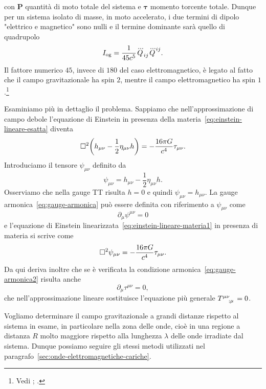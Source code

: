con $\bm{P}$ quantità di moto totale del sistema e $\bm{\tau}$ momento torcente
totale.  Dunque per un sistema isolato di masse, in moto accelerato, i due
termini di dipolo "elettrico e magnetico" sono nulli e il termine dominante sarà
quello di quadrupolo
\begin{equation}
  I_{\textup{og}} = \frac{1}{45c^{5}}\dddot{Q}_{ij}\dddot{Q}^{ij}.
\end{equation}
Il fattore numerico $45$, invece di $180$ del caso elettromagnetico, è legato al
fatto che il campo gravitazionale ha spin $2$, mentre il campo elettromagnetico
ha spin $1$.\footnote{Vedi \textcite[974]{misner:gravitation};
  \textcite[471]{shapiro:black-holes}.}

Esaminiamo più in dettaglio il problema.  Sappiamo che nell'approssimazione di
campo debole l'equazione di Einstein in presenza della
materia~\eqref{eq:einstein-lineare-esatta} diventa
\begin{equation}
  \label{eq:einstein-lineare-materia1}
  \Box^{2} \bigg(h_{\mu\nu} - \frac{1}{2} \eta_{\mu\nu}h \bigg) = -\frac{16\pi
    G}{c^{4}} \tau_{\mu\nu}.
\end{equation}
Introduciamo il tensore $\psi_{\mu\nu}$ definito da
\begin{equation}
  \psi_{\mu\nu} = h_{\mu\nu} - \frac{1}{2} \eta_{\mu\nu} h.
\end{equation}
Osserviamo che nella gauge TT risulta $h = 0$ e quindi
$\psi_{\mu\nu} = h_{\mu\nu}$.  La gauge armonica~\eqref{eq:gauge-armonica} può
essere definita con riferimento a $\psi_{\mu\nu}$ come
\begin{equation}
  \label{eq:gauge-armonica2}
  \partial_{\mu}\psi^{\mu\nu} = 0
\end{equation}
e l'equazione di Einstein linearizzata~\eqref{eq:einstein-lineare-materia1} in
presenza di materia si scrive come
\begin{equation}
  \label{eq:einstein-lineare-materia2}
  \Box^{2} \psi_{\mu\nu} = -\frac{16\pi G}{c^{4}} \tau_{\mu\nu}.
\end{equation}
Da qui deriva inoltre che se è verificata la condizione
armonica~\eqref{eq:gauge-armonica2} risulta anche
\begin{equation}
  \label{eq:gauge-armonica-tau}
  \partial_{\mu}\tau^{\mu\nu} = 0,
\end{equation}
che nell'approssimazione lineare sostituisce l'equazione più generale
$\tensor{T}{^{\mu\nu}_{;\mu}} = 0$.

Vogliamo determinare il campo gravitazionale a grandi distanze rispetto al
sistema in esame, in particolare nella zona delle onde,
cioè in una regione a distanza $R$ molto maggiore rispetto alla lunghezza
$\lambda$ delle onde irradiate dal sistema.  Dunque possiamo seguire gli stessi
metodi utilizzati nel paragrafo~\ref{sec:onde-elettromagnetiche-cariche}.

